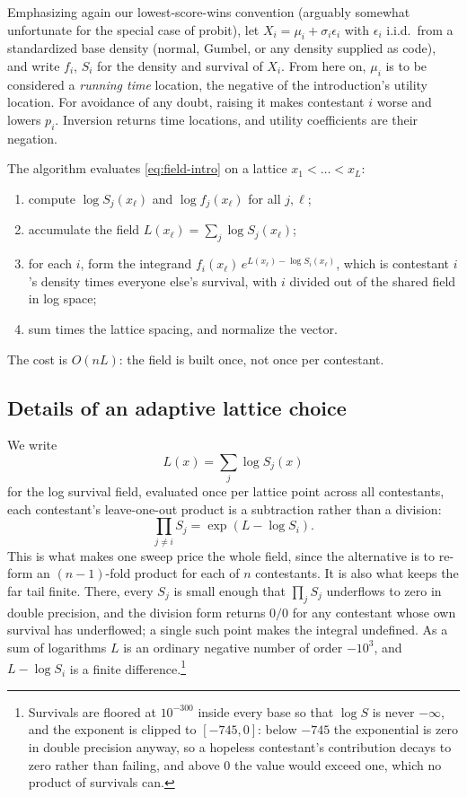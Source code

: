 \documentclass[11pt]{article}
\begin{document}
Emphasizing again our lowest-score-wins convention (arguably somewhat unfortunate for the special case of probit), let $X_i=\mu_i+\sigma_i
\epsilon_i$ with $\epsilon_i$ i.i.d.\ from a standardized base density (normal,
Gumbel, or any density supplied as code), and write $f_i$, $S_i$ for the density
and survival of $X_i$. From here on, $\mu_i$ is to be considered a \emph{running time}
location, the negative of the introduction's utility location. For avoidance of any doubt, raising
it makes contestant $i$ worse and lowers $p_i$. Inversion returns time
locations, and utility coefficients are their negation.

The algorithm evaluates \eqref{eq:field-intro} on a lattice $x_1<\dots<x_L$:
\begin{enumerate}\itemsep2pt
\item compute $\log S_j(x_\ell)$ and $\log f_j(x_\ell)$ for all $j,\ell$;
\item accumulate the field $L(x_\ell)=\sum_j \log S_j(x_\ell)$;
\item for each $i$, form the integrand
      $f_i(x_\ell)\,e^{L(x_\ell)-\log S_i(x_\ell)}$, which is contestant $i$'s
      density times everyone else's survival, with $i$ divided out of the shared
      field in log space;
\item sum times the lattice spacing, and normalize the vector.
\end{enumerate}
The cost is $O(nL)$: the field is built once, not once per contestant.

\subsection{Details of an adaptive lattice choice}

We write $$L(x)=\sum_j \log S_j(x)$$ for
the log survival field, evaluated once per lattice point across all
contestants, each contestant's leave-one-out product is a subtraction
rather than a division: $$\prod_{j\neq i}S_j = \exp(L-\log S_i).$$ This is
what makes one sweep price the whole field, since the alternative is to
re-form an $(n-1)$-fold product for each of $n$ contestants. It is also
what keeps the far tail finite. There, every $S_j$ is small enough that
$\prod_j S_j$ underflows to zero in double precision, and the division
form returns $0/0$ for any contestant whose own survival has underflowed;
a single such point makes the integral undefined. As a sum of logarithms
$L$ is an ordinary negative number of order $-10^{3}$, and $L-\log S_i$
is a finite difference.\footnote{Survivals are floored at $10^{-300}$ inside every
base so that $\log S$ is never $-\infty$, and the exponent is clipped to
$[-745,0]$: below $-745$ the exponential is zero in double precision
anyway, so a hopeless contestant's contribution decays to zero rather
than failing, and above $0$ the value would exceed one, which no product
of survivals can.}
\end{document}
